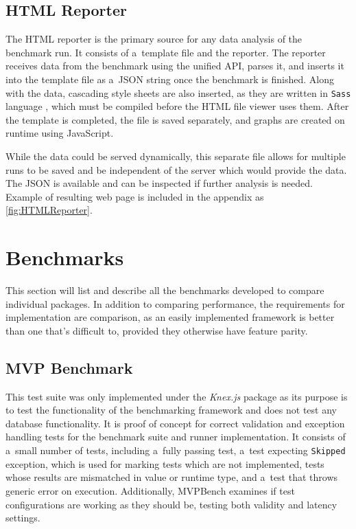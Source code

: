 \subsection*{HTML Reporter}
The HTML reporter is the primary source for any data analysis of the benchmark
run. It consists of a~template file and the reporter. The reporter receives data
from the benchmark using the unified API, parses it, and inserts it into the
template file as a~JSON string once the benchmark is finished. Along with the
data, cascading style sheets are also inserted, as they are written in
\texttt{Sass} language \cite{Sass}, which must be compiled before the HTML file
viewer uses them. After the template is completed, the file is saved separately,
and graphs are created on runtime using JavaScript.

While the data could be served dynamically, this separate file allows for
multiple runs to be saved and be independent of the server which would provide
the data. The JSON is available and can be inspected if further analysis is
needed. Example of resulting web page is included in the appendix as
\autoref{fig:HTMLReporter}.

\section{Benchmarks}
This section will list and describe all the benchmarks developed to compare
individual packages. In addition to comparing performance, the requirements for
implementation are comparison, as an easily implemented framework is better than
one that's difficult to, provided they otherwise have feature parity.

\subsection{MVP Benchmark}
This test suite was only implemented under the \textit{Knex.js} package as its
purpose is to test the functionality of the benchmarking framework and does not
test any database functionality. It is proof of concept for correct validation
and exception handling tests for the benchmark suite and runner implementation.
It consists of a~small number of tests, including a~fully passing test, a~test
expecting \texttt{Skipped} exception, which is used for marking tests which are
not implemented, tests whose results are mismatched in value or runtime type,
and a~test that throws generic error on execution. Additionally, MVPBench
examines if test configurations are working as they should be, testing both
validity and latency settings.

